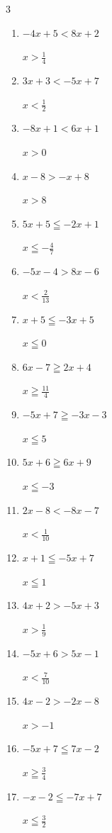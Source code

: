 \begin{multicols}{3}
\begin{enumerate}
  \item $-4x+5<8x+2$

        $\displaystyle x>\frac{1}{4}$

  \item $3x+3<-5x+7$

        $\displaystyle x<\frac{1}{2}$

\columnbreak %

  \item $-8x+1<6x+1$

        $\displaystyle x>0$

  \item $x-8>-x+8$

        $\displaystyle x>8$

  \item $5x+5\leqq -2x+1$

        $\displaystyle x\leqq -\frac{4}{7}$

  \item $-5x-4>8x-6$

        $\displaystyle x<\frac{2}{13}$

  \item $x+5\leqq -3x+5$

        $\displaystyle x\leqq 0$

  \item $6x-7\geqq 2x+4$

        $\displaystyle x\geqq \frac{11}{4}$

  \item $-5x+7\geqq -3x-3$

        $\displaystyle x\leqq 5$

  \item $5x+6\geqq 6x+9$

        $\displaystyle x\leqq -3$

  \item $2x-8<-8x-7$

        $\displaystyle x<\frac{1}{10}$

  \item $x+1\leqq -5x+7$

        $\displaystyle x\leqq 1$

  \item $4x+2>-5x+3$

        $\displaystyle x>\frac{1}{9}$

  \item $-5x+6>5x-1$

        $\displaystyle x<\frac{7}{10}$

  \item $4x-2>-2x-8$

        $\displaystyle x>-1$

  \item $-5x+7\leqq 7x-2$

        $\displaystyle x\geqq \frac{3}{4}$

  \item $-x-2\leqq -7x+7$

        $\displaystyle x\leqq \frac{3}{2}$

\end{enumerate}
\end{multicols}

